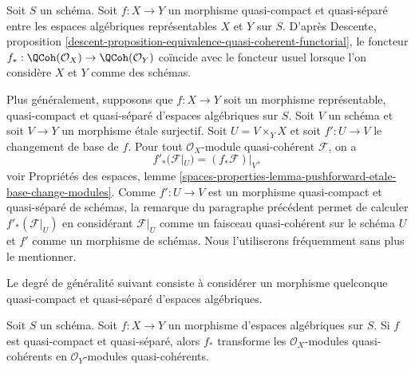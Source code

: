\noindent
Soit $S$ un schéma. Soit $f : X \to Y$ un morphisme quasi-compact et
quasi-séparé entre les espaces algébriques représentables $X$
et $Y$ sur $S$. D'après
Descente,
proposition \ref{descent-proposition-equivalence-quasi-coherent-functorial},
le foncteur
$f_* : \QCoh(\mathcal{O}_X) \to \QCoh(\mathcal{O}_Y)$
coïncide avec le foncteur usuel lorsque l'on considère $X$ et $Y$ comme des schémas.

\medskip\noindent
Plus généralement, supposons que $f : X \to Y$ soit un morphisme représentable,
quasi-compact et quasi-séparé d'espaces algébriques sur $S$. Soit $V$ un schéma
et soit $V \to Y$ un morphisme \'etale surjectif. Soit $U = V \times_Y X$
et soit $f' : U \to V$ le changement de base de $f$. Pour tout
$\mathcal{O}_X$-module quasi-cohérent $\mathcal{F}$, on a
\begin{equation}
\label{equation-representable-pushforward}
f'_*(\mathcal{F}|_U) = (f_*\mathcal{F})|_V,
\end{equation}
voir
Propriétés des espaces,
lemme \ref{spaces-properties-lemma-pushforward-etale-base-change-modules}.
Comme $f' : U \to V$ est un morphisme quasi-compact et quasi-séparé
de schémas, la remarque du paragraphe précédent permet de
calculer $f'_*(\mathcal{F}|_U)$ en considérant $\mathcal{F}|_U$ comme un
faisceau quasi-cohérent sur le schéma $U$ et $f'$ comme un morphisme de schémas.
Nous l'utiliserons fréquemment sans plus le mentionner.

\medskip\noindent
Le degré de généralité suivant consiste à considérer un morphisme quelconque
quasi-compact et quasi-séparé d'espaces algébriques.

\begin{lemma}
\label{lemma-pushforward}
Soit $S$ un schéma.
Soit $f : X \to Y$ un morphisme d'espaces algébriques sur $S$.
Si $f$ est quasi-compact et quasi-séparé, alors $f_*$ transforme les
$\mathcal{O}_X$-modules quasi-cohérents en
$\mathcal{O}_Y$-modules quasi-cohérents.
\end{lemma}

